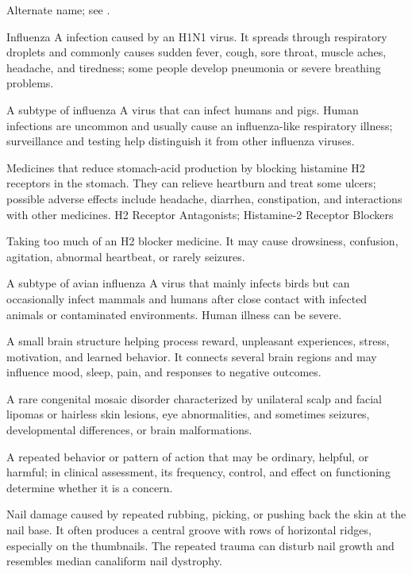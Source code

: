  Alternate name; see .

 Influenza A infection caused by an H1N1 virus. It spreads through respiratory droplets and commonly causes sudden fever, cough, sore throat, muscle aches, headache, and tiredness; some people develop pneumonia or severe breathing problems.

 A subtype of influenza A virus that can infect humans and pigs. Human infections are uncommon and usually cause an influenza-like respiratory illness; surveillance and testing help distinguish it from other influenza viruses.

 Medicines that reduce stomach-acid production by blocking histamine H2 receptors in the stomach. They can relieve heartburn and treat some ulcers; possible adverse effects include headache, diarrhea, constipation, and interactions with other medicines.
\synonyms
H2 Receptor Antagonists; Histamine-2 Receptor Blockers

 Taking too much of an H2 blocker medicine. It may cause drowsiness, confusion, agitation, abnormal heartbeat, or rarely seizures.

 A subtype of avian influenza A virus that mainly infects birds but can occasionally infect mammals and humans after close contact with infected animals or contaminated environments. Human illness can be severe.

 A small brain structure helping process reward, unpleasant experiences, stress, motivation, and learned behavior. It connects several brain regions and may influence mood, sleep, pain, and responses to negative outcomes.

 A rare congenital mosaic disorder characterized by unilateral scalp and facial lipomas or hairless skin lesions, eye abnormalities, and sometimes seizures, developmental differences, or brain malformations.

 A repeated behavior or pattern of action that may be ordinary, helpful, or harmful; in clinical assessment, its frequency, control, and effect on functioning determine whether it is a concern.

 Nail damage caused by repeated
  rubbing, picking, or pushing back the skin at the nail base. It often
  produces a central groove with rows of horizontal ridges, especially
  on the thumbnails. The repeated trauma can disturb nail growth and
  resembles median canaliform nail dystrophy.

